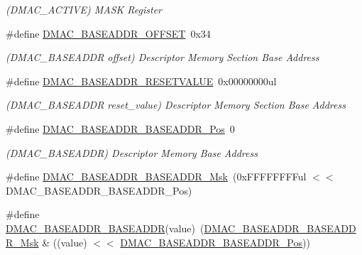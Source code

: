 \begin{DoxyCompactItemize}
\begin{DoxyCompactList}\small\item\em (D\+M\+A\+C\+\_\+\+A\+C\+T\+I\+VE) M\+A\+SK Register \end{DoxyCompactList}\item 
\#define \mbox{\hyperlink{group___s_a_m_d21___d_m_a_c_ga2b0800a455e31dbff5d2427c8838f016}{D\+M\+A\+C\+\_\+\+B\+A\+S\+E\+A\+D\+D\+R\+\_\+\+O\+F\+F\+S\+ET}}~0x34
\begin{DoxyCompactList}\small\item\em (D\+M\+A\+C\+\_\+\+B\+A\+S\+E\+A\+D\+DR offset) Descriptor Memory Section Base Address \end{DoxyCompactList}\item 
\#define \mbox{\hyperlink{group___s_a_m_d21___d_m_a_c_gaa7adfed5ff6555d1383e197e38eb3391}{D\+M\+A\+C\+\_\+\+B\+A\+S\+E\+A\+D\+D\+R\+\_\+\+R\+E\+S\+E\+T\+V\+A\+L\+UE}}~0x00000000ul
\begin{DoxyCompactList}\small\item\em (D\+M\+A\+C\+\_\+\+B\+A\+S\+E\+A\+D\+DR reset\+\_\+value) Descriptor Memory Section Base Address \end{DoxyCompactList}\item 
\#define \mbox{\hyperlink{group___s_a_m_d21___d_m_a_c_ga0374f88f6164b4a8f3a1cb907ca86245}{D\+M\+A\+C\+\_\+\+B\+A\+S\+E\+A\+D\+D\+R\+\_\+\+B\+A\+S\+E\+A\+D\+D\+R\+\_\+\+Pos}}~0
\begin{DoxyCompactList}\small\item\em (D\+M\+A\+C\+\_\+\+B\+A\+S\+E\+A\+D\+DR) Descriptor Memory Base Address \end{DoxyCompactList}\item 
\#define \mbox{\hyperlink{group___s_a_m_d21___d_m_a_c_ga7fa84a91595b134bdcdd2c49a4103015}{D\+M\+A\+C\+\_\+\+B\+A\+S\+E\+A\+D\+D\+R\+\_\+\+B\+A\+S\+E\+A\+D\+D\+R\+\_\+\+Msk}}~(0x\+F\+F\+F\+F\+F\+F\+F\+Ful $<$$<$ D\+M\+A\+C\+\_\+\+B\+A\+S\+E\+A\+D\+D\+R\+\_\+\+B\+A\+S\+E\+A\+D\+D\+R\+\_\+\+Pos)
\item 
\#define \mbox{\hyperlink{group___s_a_m_d21___d_m_a_c_ga763e8b45be532797a278a6008d7439c2}{D\+M\+A\+C\+\_\+\+B\+A\+S\+E\+A\+D\+D\+R\+\_\+\+B\+A\+S\+E\+A\+D\+DR}}(value)~(\mbox{\hyperlink{group___s_a_m_d21___d_m_a_c_ga7fa84a91595b134bdcdd2c49a4103015}{D\+M\+A\+C\+\_\+\+B\+A\+S\+E\+A\+D\+D\+R\+\_\+\+B\+A\+S\+E\+A\+D\+D\+R\+\_\+\+Msk}} \& ((value) $<$$<$ \mbox{\hyperlink{group___s_a_m_d21___d_m_a_c_ga0374f88f6164b4a8f3a1cb907ca86245}{D\+M\+A\+C\+\_\+\+B\+A\+S\+E\+A\+D\+D\+R\+\_\+\+B\+A\+S\+E\+A\+D\+D\+R\+\_\+\+Pos}}))
\item 

\end{DoxyCompactItemize}
